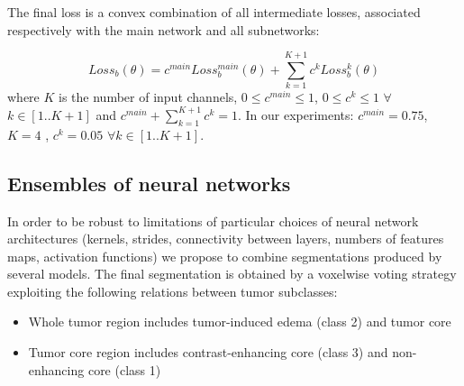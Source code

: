 \documentclass[preprint,12pt]{elsarticle}
\begin{document}
The final loss is a convex combination of all intermediate losses, associated respectively with the main network and all subnetworks:

\begin{equation}
\label{eq_loss2D}
Loss_{b}(\theta)= c^{main} Loss_{b}^{main}(\theta)+ \sum_{k=1}^{K+1} c^{k} Loss_{b} ^{k}(\theta)
\end{equation}
where $K$ is the number of input channels, $0 \leq c^{main} \leq 1$, $0 \leq c^{k} \leq 1$ $\forall$ $k \in [1..K+1]$ and ${c^{main} +\sum_{k=1}^{K+1} c^{k}=1}$. In our experiments: $c^{main}=0.75$,  $K=4$ , $c^{k}=0.05$  ${\forall k \in [1..K+1]}$.

\subsection{Ensembles of neural networks}
\label{section_ensembling}
In order to be robust to limitations of particular choices of neural network architectures (kernels, strides, connectivity between layers, numbers of features maps, activation functions) we propose to combine segmentations produced by several models. The final segmentation is obtained by a voxelwise voting strategy exploiting the following relations between tumor subclasses: 
\begin{itemize}
\item Whole tumor region includes tumor-induced edema (class 2) and tumor core
\item Tumor core region includes contrast-enhancing core (class 3) and non-enhancing core (class 1)
\end{itemize}
\end{document}
